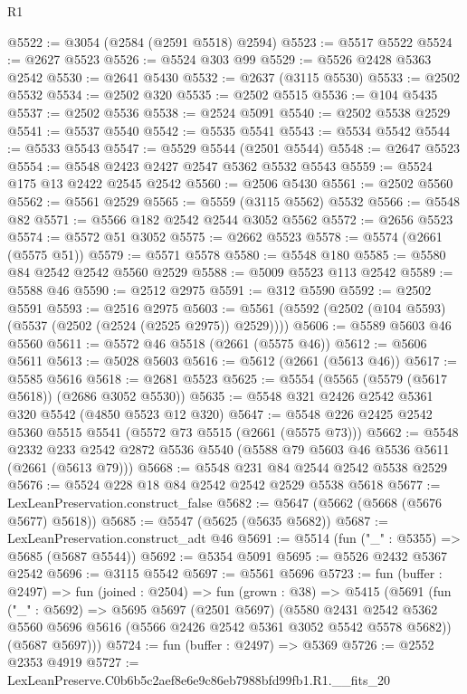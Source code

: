 \begin{lexlean}{R1}
\begin{coremodule}
@5522 := @3054 (@2584 (@2591 @5518) @2594)
@5523 := @5517 @5522
@5524 := @2627 @5523
@5526 := @5524 @303 @99
@5529 := @5526 @2428 @5363 @2542
@5530 := @2641 @5430
@5532 := @2637 (@3115 @5530)
@5533 := @2502 @5532
@5534 := @2502 @320
@5535 := @2502 @5515
@5536 := @104 @5435
@5537 := @2502 @5536
@5538 := @2524 @5091
@5540 := @2502 @5538 @2529
@5541 := @5537 @5540
@5542 := @5535 @5541
@5543 := @5534 @5542
@5544 := @5533 @5543
@5547 := @5529 @5544 (@2501 @5544)
@5548 := @2647 @5523
@5554 := @5548 @2423 @2427 @2547 @5362 @5532 @5543
@5559 := @5524 @175 @13 @2422 @2545 @2542
@5560 := @2506 @5430
@5561 := @2502 @5560
@5562 := @5561 @2529
@5565 := @5559 (@3115 @5562) @5532
@5566 := @5548 @82
@5571 := @5566 @182 @2542 @2544 @3052 @5562
@5572 := @2656 @5523
@5574 := @5572 @51 @3052
@5575 := @2662 @5523
@5578 := @5574 (@2661 (@5575 @51))
@5579 := @5571 @5578
@5580 := @5548 @180
@5585 := @5580 @84 @2542 @2542 @5560 @2529
@5588 := @5009 @5523 @113 @2542
@5589 := @5588 @46
@5590 := @2512 @2975
@5591 := @312 @5590
@5592 := @2502 @5591
@5593 := @2516 @2975
@5603 := @5561 (@5592 (@2502 (@104 @5593) (@5537 (@2502 (@2524 (@2525 @2975)) @2529))))
@5606 := @5589 @5603 @46 @5560
@5611 := @5572 @46 @5518 (@2661 (@5575 @46))
@5612 := @5606 @5611
@5613 := @5028 @5603
@5616 := @5612 (@2661 (@5613 @46))
@5617 := @5585 @5616
@5618 := @2681 @5523
@5625 := @5554 (@5565 (@5579 (@5617 @5618)) (@2686 @3052 @5530))
@5635 := @5548 @321 @2426 @2542 @5361 @320 @5542 (@4850 @5523 @12 @320)
@5647 := @5548 @226 @2425 @2542 @5360 @5515 @5541 (@5572 @73 @5515 (@2661 (@5575 @73)))
@5662 := @5548
    @2332
    @233
    @2542
    @2872
    @5536
    @5540
    (@5588 @79 @5603 @46 @5536 @5611 (@2661 (@5613 @79)))
@5668 := @5548 @231 @84 @2544 @2542 @5538 @2529
@5676 := @5524 @228 @18 @84 @2542 @2542 @2529 @5538 @5618
@5677 := LexLeanPreservation.construct_false
@5682 := @5647 (@5662 (@5668 (@5676 @5677) @5618))
@5685 := @5547 (@5625 (@5635 @5682))
@5687 := LexLeanPreservation.construct_adt @46
@5691 := @5514 (fun ("_" : @5355) => @5685 (@5687 @5544))
@5692 := @5354 @5091
@5695 := @5526 @2432 @5367 @2542
@5696 := @3115 @5542
@5697 := @5561 @5696
@5723 := fun (buffer : @2497) =>
  fun (joined : @2504) =>
  fun (grown : @38) =>
  @5415
    (@5691
      (fun ("_" : @5692) =>
      @5695
        @5697
        (@2501 @5697)
        (@5580
          @2431
          @2542
          @5362
          @5560
          @5696
          @5616
          (@5566 @2426 @2542 @5361 @3052 @5542 @5578 @5682))
        (@5687 @5697)))
@5724 := fun (buffer : @2497) => @5369
@5726 := @2552 @2353 @4919
@5727 := LexLeanPreserve.C0b6b5c2aef8e6e9c86eb7988bfd99fb1.R1.__fits_20

\end{coremodule}
\end{lexlean}
